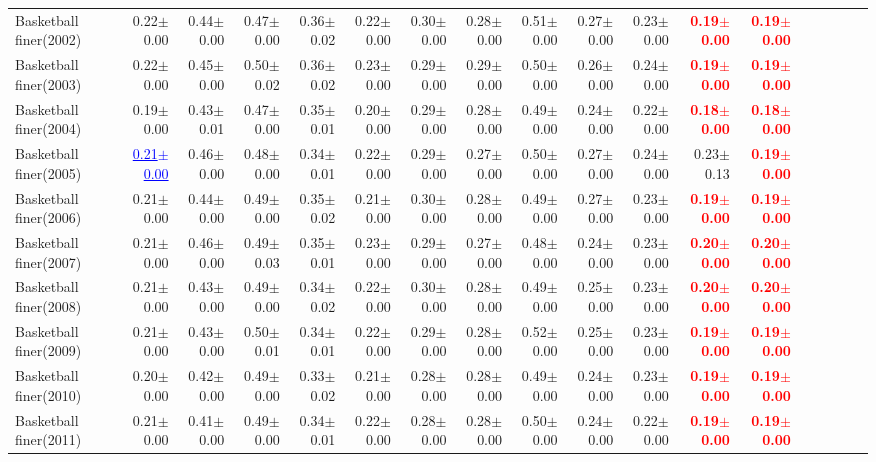 \documentclass[nohyperref]{article}
\theoremstyle{plain}
\theoremstyle{definition}
\theoremstyle{remark}
\newcommand{\red}[1]{\textcolor{red}{\textbf{#1}}}
\newcommand{\blue}[1]{\textcolor{blue}{\underline{#1}}}
\begin{document}
\begin{table*}[!ht]
{\begin{tabular}{lrrrrrrrrrrrrrrrrr}
			Basketball finer(2002) & 0.22$\pm$0.00 & 0.44$\pm$0.00 & 0.47$\pm$0.00 & 0.36$\pm$0.02 & 0.22$\pm$0.00 & 0.30$\pm$0.00 & 0.28$\pm$0.00 & 0.51$\pm$0.00 & 0.27$\pm$0.00 & 0.23$\pm$0.00 & \red{0.19$\pm$0.00} & \red{0.19$\pm$0.00} \\
			Basketball finer(2003) & 0.22$\pm$0.00 & 0.45$\pm$0.00 & 0.50$\pm$0.02 & 0.36$\pm$0.02 & 0.23$\pm$0.00 & 0.29$\pm$0.00 & 0.29$\pm$0.00 & 0.50$\pm$0.00 & 0.26$\pm$0.00 & 0.24$\pm$0.00 & \red{0.19$\pm$0.00} & \red{0.19$\pm$0.00} \\
			Basketball finer(2004) & 0.19$\pm$0.00 & 0.43$\pm$0.01 & 0.47$\pm$0.00 & 0.35$\pm$0.01 & 0.20$\pm$0.00 & 0.29$\pm$0.00 & 0.28$\pm$0.00 & 0.49$\pm$0.00 & 0.24$\pm$0.00 & 0.22$\pm$0.00 & \red{0.18$\pm$0.00} & \red{0.18$\pm$0.00} \\
			Basketball finer(2005) & \blue{0.21$\pm$0.00} & 0.46$\pm$0.00 & 0.48$\pm$0.00 & 0.34$\pm$0.01 & 0.22$\pm$0.00 & 0.29$\pm$0.00 & 0.27$\pm$0.00 & 0.50$\pm$0.00 & 0.27$\pm$0.00 & 0.24$\pm$0.00 & 0.23$\pm$0.13 & \red{0.19$\pm$0.00} \\
			Basketball finer(2006) & 0.21$\pm$0.00 & 0.44$\pm$0.00 & 0.49$\pm$0.00 & 0.35$\pm$0.02 & 0.21$\pm$0.00 & 0.30$\pm$0.00 & 0.28$\pm$0.00 & 0.49$\pm$0.00 & 0.27$\pm$0.00 & 0.23$\pm$0.00 & \red{0.19$\pm$0.00} & \red{0.19$\pm$0.00} \\
			Basketball finer(2007) & 0.21$\pm$0.00 & 0.46$\pm$0.00 & 0.49$\pm$0.03 & 0.35$\pm$0.01 & 0.23$\pm$0.00 & 0.29$\pm$0.00 & 0.27$\pm$0.00 & 0.48$\pm$0.00 & 0.24$\pm$0.00 & 0.23$\pm$0.00 & \red{0.20$\pm$0.00} & \red{0.20$\pm$0.00} \\
			Basketball finer(2008) & 0.21$\pm$0.00 & 0.43$\pm$0.00 & 0.49$\pm$0.00 & 0.34$\pm$0.02 & 0.22$\pm$0.00 & 0.30$\pm$0.00 & 0.28$\pm$0.00 & 0.49$\pm$0.00 & 0.25$\pm$0.00 & 0.23$\pm$0.00 & \red{0.20$\pm$0.00} & \red{0.20$\pm$0.00} \\
			Basketball finer(2009) & 0.21$\pm$0.00 & 0.43$\pm$0.00 & 0.50$\pm$0.01 & 0.34$\pm$0.01 & 0.22$\pm$0.00 & 0.29$\pm$0.00 & 0.28$\pm$0.00 & 0.52$\pm$0.00 & 0.25$\pm$0.00 & 0.23$\pm$0.00 & \red{0.19$\pm$0.00} & \red{0.19$\pm$0.00} \\
			Basketball finer(2010) & 0.20$\pm$0.00 & 0.42$\pm$0.00 & 0.49$\pm$0.00 & 0.33$\pm$0.02 & 0.21$\pm$0.00 & 0.28$\pm$0.00 & 0.28$\pm$0.00 & 0.49$\pm$0.00 & 0.24$\pm$0.00 & 0.23$\pm$0.00 & \red{0.19$\pm$0.00} & \red{0.19$\pm$0.00} \\
			Basketball finer(2011) & 0.21$\pm$0.00 & 0.41$\pm$0.00 & 0.49$\pm$0.00 & 0.34$\pm$0.01 & 0.22$\pm$0.00 & 0.28$\pm$0.00 & 0.28$\pm$0.00 & 0.50$\pm$0.00 & 0.24$\pm$0.00 & 0.22$\pm$0.00 & \red{0.19$\pm$0.00} & \red{0.19$\pm$0.00} \\

\end{tabular}}
\end{table*}
\end{document}
